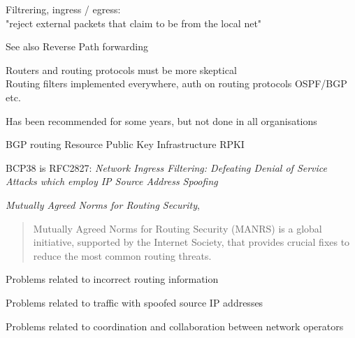 \documentclass[Screen16to9,17pt]{foils}
\begin{document}

\begin{list2}
\item Filtrering, ingress / egress:\\
"reject external packets that claim to be from the local net"
\item See also Reverse Path forwarding 
\item Routers and routing protocols must be more skeptical\\
Routing filters implemented everywhere, auth on routing protocols OSPF/BGP etc.
\item Has been recommended for some years, but not done in all organisations
\item BGP routing Resource Public Key Infrastructure RPKI
\item BCP38 is RFC2827: \emph{Network Ingress Filtering: Defeating Denial of Service Attacks which employ IP Source Address Spoofing}\\
\item \emph{Mutually Agreed Norms for Routing Security}, 
\end{list2}




\begin{quote}
  Mutually Agreed Norms for Routing Security (MANRS) is a global initiative, supported by the Internet Society, that provides crucial fixes to reduce the most common routing threats. ﻿
\end{quote}

\begin{list1}
\item Problems related to incorrect routing information
\item Problems related to traffic with spoofed source IP addresses
\item Problems related to coordination and collaboration between network operators
\item {\small{}}
\item {\small{}}
\end{list1}

\end{document}
